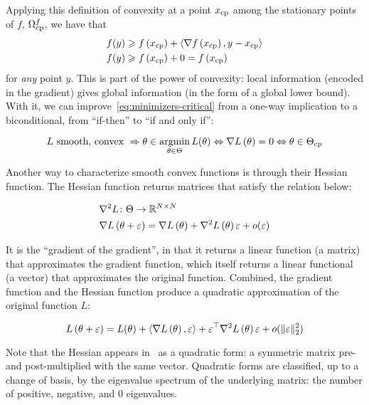 \documentclass[../../thesis.tex]{subfiles}
\begin{document}
Applying this definition of convexity at a point $x_{\mathrm{cp}}$
among the stationary points of $f$, $\Omega^f_{\mathrm{cp}}$,
we have that
\begin{align}
	f(y) &\geqslant f\left(x_{\mathrm{cp}}\right) + \langle\nabla f\left(x_{\mathrm{cp}}\right), y - x_{\mathrm{cp}} \rangle\\
	f(y) &\geqslant f\left(x_{\mathrm{cp}}\right) + 0 = f\left(x_{\mathrm{cp}}\right)
\end{align}
for \emph{any} point $y$.
This is part of the power of convexity:
local information (encoded in the gradient)
gives global information (in the form of a global lower bound).
With it, we can improve~\ref{eq:minimizers-critical}
from a one-way implication to a biconditional,
from \enquote{if-then} to
\enquote{if and only if}:

\begin{equation}\equationlabel{convexity-critical}
	L \text{\ smooth, convex\ } \Rightarrow\\
	\theta \in \argmin_{\theta \in \Theta} L(\theta) \Leftrightarrow \grad{L}{\theta} = 0 \Leftrightarrow \theta \in \Theta_{\cp}
\end{equation}

Another way to characterize smooth convex functions is through their Hessian function.
The Hessian function returns matrices that satisfy the relation below:

\begin{align}
	&\nabla^2{L}\from \Theta \to \R^{N\times N}\\
	&\grad{L}{\theta + \eps} = \grad{L}{\theta} + \hess{L}{\theta}\eps + o(\eps)\equationlabel{def-hess}
\end{align}

It is the \enquote{gradient of the gradient},
in that it returns a linear function (a matrix)
that approximates the gradient function,
which itself returns a linear functional (a vector)
that approximates the original function.
Combined, the gradient function and the Hessian function produce a quadratic approximation
of the original function $L$:

\begin{equation}
	L\left(\theta + \eps\right) =
	L(\theta)
	+ \langle\grad{L}{\theta},\eps\rangle
	+ \eps^\top\hess{L}{\theta}\eps + o(\snormt{\eps})\equationlabel{taylor-two}
\end{equation}

Note that the Hessian appears in~
as a quadratic form:
a symmetric matrix pre- and post-multiplied with the same vector.
Quadratic forms are classified,
up to a change of basis, by the eigenvalue spectrum
of the underlying matrix:
the number of positive, negative, and 0 eigenvalues.
\end{document}

